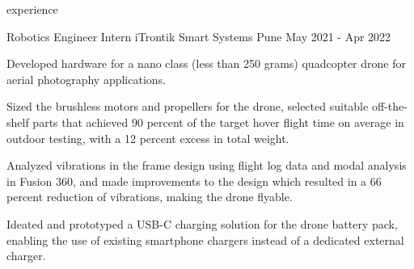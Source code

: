 \begin{section}{experience}
\begin{work}


  \end{work}

  \begin{work}
    {Robotics Engineer Intern}
    {iTrontik Smart Systems}
    {Pune}
    {May 2021 - Apr 2022}

    \item Developed hardware for a nano class (less than 250 grams) quadcopter drone for aerial
          photography applications.

    \item Sized the brushless motors and propellers for the drone, selected suitable off-the-shelf
          parts that achieved 90 percent of the target hover flight time on average in outdoor testing,
          with a 12 percent excess in total weight.


    \item Analyzed vibrations in the frame design using flight log data and modal analysis in Fusion
          360, and made improvements to the design which resulted in a 66 percent reduction of
          vibrations, making the drone flyable.


    \item Ideated and prototyped a USB-C charging solution for the drone battery pack, enabling
          the use of existing smartphone chargers instead of a dedicated external charger.


\end{work}
\end{section}
